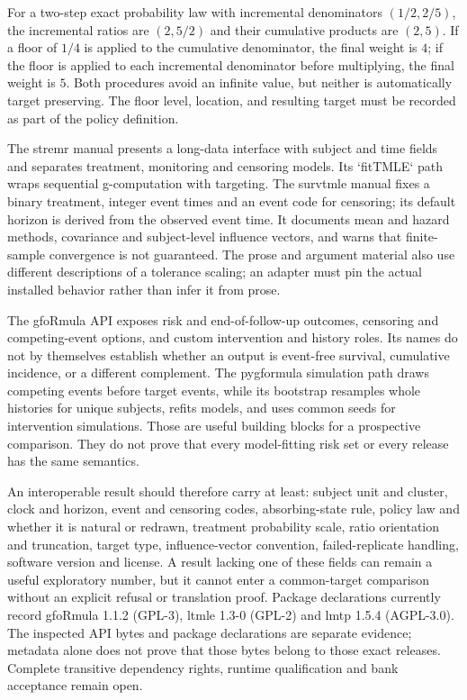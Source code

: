For a two-step exact probability law with incremental denominators
$(1/2,2/5)$, the incremental ratios are $(2,5/2)$ and their cumulative
products are $(2,5)$. If a floor of $1/4$ is applied to the cumulative
denominator, the final weight is $4$; if the floor is applied to each
incremental denominator before multiplying, the final weight is $5$. Both
procedures avoid an infinite value, but neither is automatically target
preserving. The floor level, location, and resulting target must be recorded
as part of the policy definition.

The stremr manual presents a long-data interface with subject and time fields
and separates treatment, monitoring and censoring models. Its `fitTMLE` path
wraps sequential g-computation with targeting. The survtmle manual fixes a
binary treatment, integer event times and an event code for censoring; its
default horizon is derived from the observed event time. It documents mean and
hazard methods, covariance and subject-level influence vectors, and warns that
finite-sample convergence is not guaranteed. The prose and argument material
also use different descriptions of a tolerance scaling; an adapter must pin
the actual installed behavior rather than infer it from prose.\citep{v12_sw_stremr,v12_sw_survtmle}

The gfoRmula API exposes risk and end-of-follow-up outcomes, censoring and
competing-event options, and custom intervention and history roles. Its names
do not by themselves establish whether an output is event-free survival,
cumulative incidence, or a different complement. The pygformula simulation
path draws competing events before target events, while its bootstrap resamples
whole histories for unique subjects, refits models, and uses common seeds for
intervention simulations. Those are useful building blocks for a prospective
comparison. They do not prove that every model-fitting risk set or every
release has the same semantics.\citep{sw_gformula,v13_sw_pygformula}

An interoperable result should therefore carry at least: subject unit and
cluster, clock and horizon, event and censoring codes, absorbing-state rule,
policy law and whether it is natural or redrawn, treatment probability scale,
ratio orientation and truncation, target type, influence-vector convention,
failed-replicate handling, software version and license. A result lacking one
of these fields can remain a useful exploratory number, but it cannot enter a
common-target comparison without an explicit refusal or translation proof.
Package declarations currently record gfoRmula 1.1.2 (GPL-3), ltmle 1.3-0
(GPL-2) and lmtp 1.5.4 (AGPL-3.0). The inspected API bytes and package
declarations are separate evidence; metadata alone does not prove that those
bytes belong to those exact releases. Complete transitive dependency rights,
runtime qualification and bank acceptance remain open.

